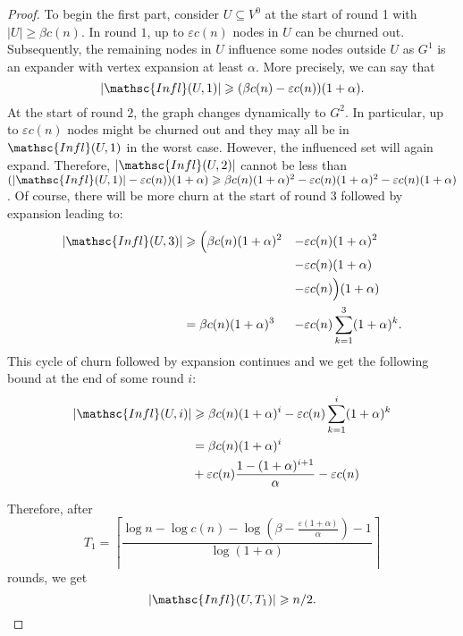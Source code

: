 \documentclass[leqno,11pt]{article}
\renewcommand{\ge}{\geqslant}
\newcommand{\eps}{\varepsilon}
\newcommand{\infl}{{\mathsc{Infl}}}
\begin{document}
{\begin{proof}
To begin the first part, consider $U \subseteq V^0$ at the start of round 1 with $|U| \ge \beta c(n)$. 
In round $1$, up to $\eps c(n)$ nodes in $U$ can be churned out. Subsequently, the remaining  nodes in $U$ influence some nodes outside $U$ as $G^1$ is
an expander with vertex expansion at least $\alpha$. More precisely, we can say that
\begin{equation}
|\infl(U,1)| \ge (\beta c(n) - \eps c(n)) (1+\alpha).
\end{equation} At the start of round $2$, the graph
changes dynamically to $G^{2}$. In particular, up to $\eps c(n)$ nodes  might be
churned out and they may all be in $\infl(U,1)$ in the worst case. However, the influenced set will again expand. Therefore, $|\infl(U,2)|$ cannot be less than
$(|\infl(U,1)| - \eps c(n))(1+\alpha) \ge \beta c(n)(1+\alpha)^2 - \eps c(n) (1+\alpha)^2 - \eps c(n) (1 +\alpha)$. Of course, there will be more churn at the start of round 3 followed by expansion leading to:
\begin{alignat*}{2}
|\infl(U,3)| 
  &\ge \Big(\beta c(n)(1+\alpha)^2 &-& \eps c(n) (1+\alpha)^2\\
  && -& \eps c(n) (1 +\alpha) \\
  && -& \eps c(n)\Big) (1+\alpha) \\
  &= \beta c(n) (1+\alpha)^3 &-& \eps c(n)\sum_{k=1}^3(1+\alpha)^k.
\end{alignat*}
This cycle of churn  followed by expansion continues and we get the following
bound at the end of some round $i$:
\begin{align*}
  |\infl(U,i)|  &\ge \beta c(n) (1+\alpha)^i - \eps c(n)\sum_{k=1}^{i}(1+\alpha)^k  \\
&= \beta c(n) (1+\alpha)^i \\
&+ \eps c(n) \frac{1- (1+\alpha)^{i+1}}{\alpha} - \eps c(n)
\end{align*}

Therefore, after 
\begin{equation}
T_1 = \left \lceil \frac{\log n - \log c(n) - \log (\beta - \frac{\eps
(1+\alpha)}{\alpha}) - 1 }{\log(1+\alpha)} \right \rceil\end{equation} 
rounds, we get 
\begin{equation} \label{eq:part1}
  |\infl(U,T_1)|\ge n/2\text{.}
\end{equation}


\end{proof}}
\end{document}
